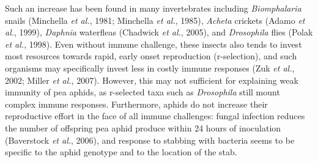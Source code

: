 \documentclass[11pt]{article}
\begin{document}
Such an increase has been found in many invertebrates including \textit{Biomphalaria} snails (Minchella \textit{et al.}, 1981; Minchella \textit{et al.}, 1985), \textit{Acheta} crickets (Adamo \textit{et al.}, 1999), \textit{Daphnia} waterfleas (Chadwick \textit{et al.}, 2005), and \textit{Drosophila} flies (Polak \textit{et al.}, 1998). 
Even without immune challenge, these insects also tends to invest most resources towards rapid, early onset reproduction (r-selection), and such organisms may specifically invest less in costly immune responses (Zuk \textit{et al.}, 2002; Miller \textit{et al.}, 2007). 
However, this may not sufficient for explaining weak immunity of pea aphids, as r-selected taxa such as \textit{Drosophila} still mount complex immune responses. 
Furthermore, aphids do not increase their reproductive effort in the face of all immune challenges: 
fungal infection reduces the number of offspring pea aphid produce within 24 hours of inoculation (Baverstock \textit{et al.}, 2006), and response to stabbing with bacteria seems to be specific to the aphid genotype and to the location of the stab.
\end{document}
